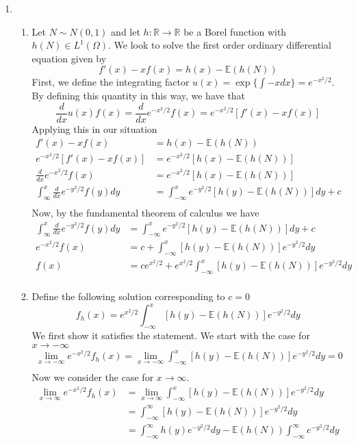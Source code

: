 \documentclass[12pt]{article}  %
\newcommand{\R}{{\mathbb{R}}}
\newcommand{\E}{{\mathbb{E}}}
\begin{document}
\begin{enumerate}
\item 
\begin{enumerate}
\item Let $N\sim N(0,1)$ and let $h:\R\to\R$ be a Borel function with $h(N)\in L^1(\Omega)$. We look to solve the first order ordinary differential equation given by $$f'(x) - xf(x) = h(x)-\E(h(N))$$
First, we define the integrating factor $u(x) = \exp\Big\{\int -xdx\Big\} = e^{-x^2/2}$. By defining this quantity in this way, we have that $$\frac{d}{dx}u(x)f(x) = \frac{d}{dx}e^{-x^2/2}f(x) = e^{-x^2/2}[f'(x)-xf(x)]$$
Applying this in our situation 
\begin{align*}
f'(x) - xf(x) &= h(x)-\E(h(N))\\
e^{-x^2/2}[f'(x) - xf(x)] &= e^{-x^2/2}[h(x)-\E(h(N))]\\
\frac{d}{dx}e^{-x^2/2}f(x) &= e^{-x^2/2}[h(x)-\E(h(N))]\\
\int_{\infty}^{x}\frac{d}{dx}e^{-y^2/2}f(y)dy &= \int_{-\infty}^{x}e^{-y^2/2}[h(y)-\E(h(N))]dy + c\\
\end{align*}
Now, by the fundamental theorem of calculus we have 
\begin{align*}
\int_{\infty}^{x}\frac{d}{dx}e^{-y^2/2}f(y)dy &= \int_{-\infty}^{x}e^{-y^2/2}[h(y)-\E(h(N))]dy + c\\
e^{-x^2/2}f(x) &= c + \int_{-\infty}^{x}[h(y)-\E(h(N))]e^{-y^2/2}dy\\
f(x) &= ce^{x^2/2} + e^{x^2/2}\int_{-\infty}^{x}[h(y)-\E(h(N))]e^{-y^2/2}dy\\
\end{align*}
\item Define the following solution corresponding to $c = 0$ $$f_h(x) = e^{x^2/2}\int_{-\infty}^{x}[h(y ) - \E(h(N))]e^{-y^2/2}dy$$ We first show it satisfies the statement. We start with the case for $x\to-\infty$
\begin{align*}
\lim_{x\to -\infty} e^{-x^2/2}f_h(x) = \lim_{x\to-\infty}\int_{-\infty}^{x}[h(y ) - \E(h(N))]e^{-y^2/2}dy = 0 \\
\end{align*}
Now we consider the case for $x\to\infty$. 
\begin{align*}
\lim_{x\to \infty} e^{-x^2/2}f_h(x) &= \lim_{x\to\infty}\int_{-\infty}^{x}[h(y) - \E(h(N))]e^{-y^2/2}dy\\
&= \int_{-\infty}^{\infty}[h(y) - \E(h(N))]e^{-y^2/2}dy\\
&= \int_{-\infty}^{\infty}h(y)e^{-y^2/2}dy -  \E(h(N))\int_{-\infty}^{\infty}e^{-y^2/2}dy\\

\end{align*}
\end{enumerate}
\end{enumerate}
\end{document}
